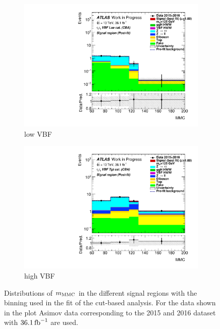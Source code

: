 \begin{figure}[htb]
\begin{subfigure}[t]{0.45\textwidth}
        \includegraphics[width=\textwidth]{./plots/fit/cba/sig_vbfloose.pdf}
        \caption{low VBF}
    \end{subfigure}
    \begin{subfigure}[t]{0.45\textwidth}
        \includegraphics[width=\textwidth]{./plots/fit/cba/sig_vbftight.pdf}
        \caption{high VBF}
    \end{subfigure}
    \caption{Distributions of $m_\text{MMC}$ in the different signal regions with the binning used in the fit of the cut-based analysis.
             For the data shown in the plot Asimov data corresponding to the 2015 and 2016 dataset with $\SI{36.1}{\invfb}$ are used.}\label{fig:fit:input:cba:SR}
\end{figure}

